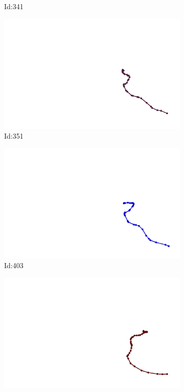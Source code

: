 \documentclass[12pt,twoside]{report}
\begin{document}
\begin{figure}
\begin{subfigure}[b]{0.20\textwidth}
\caption{Id:341}
\end{subfigure}
\begin{subfigure}[b]{0.20\textwidth}
\centering
\includegraphics[width=\textwidth]{../trajectories/351.png}
\caption{Id:351}
\end{subfigure}
\begin{subfigure}[b]{0.20\textwidth}
\centering
\includegraphics[width=\textwidth]{../trajectories/403.png}
\caption{Id:403}
\end{subfigure}
\begin{subfigure}[b]{0.20\textwidth}
\centering
\includegraphics[width=\textwidth]{../trajectories/418.png}

\end{subfigure}
\end{figure}
\end{document}
